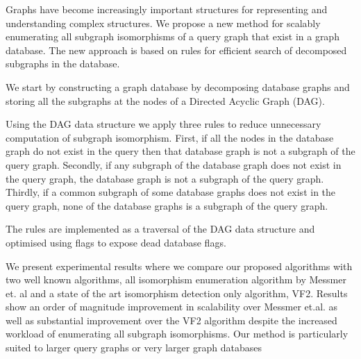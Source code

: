 
Graphs have become increasingly important structures for representing and understanding complex structures.
We propose a new method for scalably enumerating all subgraph isomorphisms of a query graph that exist in a graph database. The new approach is based on rules for efficient search of decomposed subgraphs in the database.

We start by constructing a graph database by decomposing database graphs and storing all the subgraphs at the nodes of a Directed Acyclic Graph (DAG).

Using the DAG data structure we apply three rules to reduce unnecessary computation of subgraph isomorphism. First, if all the nodes in the database graph do not exist in the query then that database graph is not a subgraph of the query graph. Secondly, if any subgraph of the database graph does not exist in the query graph, the database graph is not a subgraph of the query graph. Thirdly, if a common subgraph of some database graphs does not exist in the query graph, none of the database graphs is a subgraph of the query graph.

The rules are implemented as a traversal of the DAG data structure and optimised using flags to expose dead database flags. 

We present experimental results where we compare our proposed algorithms with two well known algorithms, all isomorphism enumeration algorithm by Messmer et. al and a state of the art isomorphism detection only algorithm, VF2. Results show an order of magnitude improvement in scalability over Messmer et.al. as well as substantial improvement over the VF2 algorithm despite the increased workload of enumerating all subgraph isomorphisms. Our method is particularly suited to larger query graphs or very larger graph databases


